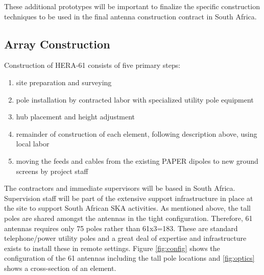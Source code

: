 \documentclass[preprint]{aastex}
\begin{document}
These additional prototypes will be important to finalize the specific construction techniques to be 
used in the final antenna construction contract in South Africa.

\vspace{-0.25in}
\subsection{Array Construction}
\vspace{-6pt}
Construction of HERA-61 consists of five primary steps: 
\begin{enumerate}
\item site preparation and surveying 
\item pole installation by contracted labor with specialized utility pole equipment 
\item hub placement and height adjustment
\item remainder of construction of each element, following description above, using local labor 
\item moving the feeds and cables from the existing PAPER dipoles to new ground screens by project staff
\end{enumerate}

The contractors and immediate supervisors will be based in South Africa.  Supervision staff 
will be part of the extensive support infrastructure in place at the site to support South African SKA activities.
As mentioned above, the tall poles are shared amongst the antennas in the tight configuration.  
Therefore, 61 antennas requires only 75 poles rather than 61x3=183.  These are standard telephone/power 
utility poles and a great deal of  expertise and infrastructure exists to install these in remote settings.  
Figure \ref{fig:config} shows the configuration of the 61 antennas including the tall pole locations and \ref{fig:optics} shows a cross-section of an element.
\end{document}
